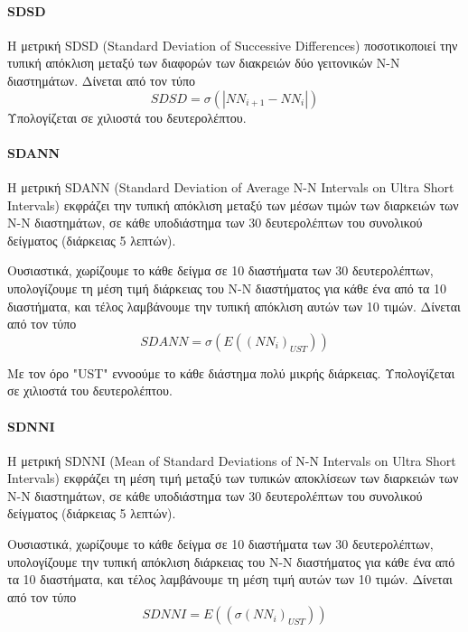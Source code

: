 \paragraph{SDSD}
Η μετρική SDSD (Standard Deviation of Successive Differences)  ποσοτικοποιεί την τυπική απόκλιση μεταξύ των διαφορών των διακρειών δύο γειτονικών Ν-Ν διαστημάτων. Δίνεται από τον τύπο
\begin{equation}
\label{eq:SDRR}
   SDSD=\sigma(|NN_{i+1} - NN_i|)
\end{equation}
Υπολογίζεται σε χιλιοστά του δευτερολέπτου.

\paragraph{SDANN}
Η μετρική SDANN (Standard Deviation of Average N-N Intervals on Ultra Short Intervals)   εκφράζει την τυπική απόκλιση μεταξύ των μέσων τιμών των διαρκειών των Ν-Ν διαστημάτων, σε κάθε υποδιάστημα των 30 δευτερολέπτων του συνολικού δείγματος (διάρκειας 5 λεπτών).

Ουσιαστικά, χωρίζουμε το κάθε δείγμα σε 10 διαστήματα των 30 δευτερολέπτων, υπολογίζουμε τη μέση τιμή διάρκειας του Ν-Ν διαστήματος για κάθε ένα από τα 10 διαστήματα, και τέλος λαμβάνουμε την τυπική απόκλιση αυτών των 10 τιμών. Δίνεται από τον τύπο
\begin{equation}
\label{eq:SDANN}
   SDANN=\sigma(E((NN_i)_{UST}))
\end{equation}

Με τον όρο "UST" εννοούμε το κάθε διάστημα πολύ μικρής διάρκειας. Υπολογίζεται σε χιλιοστά του δευτερολέπτου.

\paragraph{SDNNI}
Η μετρική SDNNI (Mean of Standard Deviations of N-N Intervals on Ultra Short Intervals)   εκφράζει τη μέση τιμή μεταξύ των τυπικών αποκλίσεων των διαρκειών των Ν-Ν διαστημάτων, σε κάθε υποδιάστημα των 30 δευτερολέπτων του συνολικού δείγματος (διάρκειας 5 λεπτών).

Ουσιαστικά, χωρίζουμε το κάθε δείγμα σε 10 διαστήματα των 30 δευτερολέπτων, υπολογίζουμε την τυπική απόκλιση διάρκειας του Ν-Ν διαστήματος για κάθε ένα από τα 10 διαστήματα, και τέλος λαμβάνουμε τη μέση τιμή αυτών των 10 τιμών. Δίνεται από τον τύπο
\begin{equation}
\label{eq:SDNNI}
   SDNNI=E((\sigma(NN_i)_{UST}))
\end{equation}

